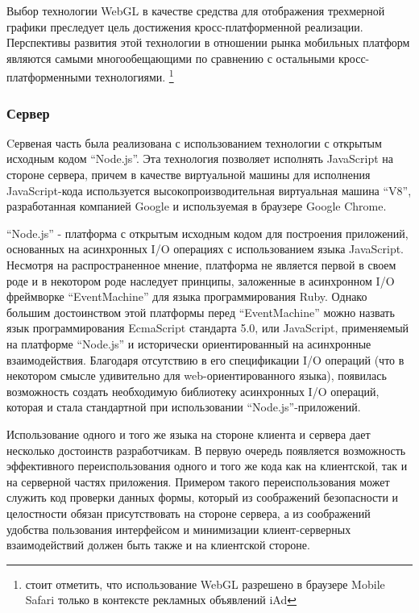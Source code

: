 Выбор технологии WebGL в качестве средства для отображения трехмерной графики
преследует цель достижения кросс-платформенной реализации. Перспективы развития
этой технологии в отношении рынка мобильных платформ являются самыми
многообещающими по сравнению с остальными кросс-платформенными технологиями.
\footnote{стоит отметить, что использование WebGL разрешено в браузере Mobile
Safari только в контексте рекламных объявлений iAd}

\subsubsection{Сервер}

Cервеная часть была реализована с использованием технологии с открытым исходным
кодом ``Node.js''. Эта технология позволяет исполнять JavaScript на стороне
сервера, причем в качестве виртуальной машины для исполнения JavaScript-кода
используется высокопроизводительная виртуальная машина ``V8'', разработанная
компанией Google и используемая в браузере Google Chrome.

``Node.js''\cite{nodejs} - платформа с открытым исходным кодом для построения приложений,
основанных на асинхронных I/O операциях с использованием языка JavaScript.
Несмотря на распространенное мнение, платформа не является первой в своем роде и
в некотором роде наследует принципы, заложенные в асинхронном I/O фреймворке
``EventMachine'' для языка программирования Ruby. Однако большим достоинством
этой платформы перед ``EventMachine'' можно назвать язык программирования
EcmaScript стандарта 5.0, или JavaScript, применяемый на платформе ``Node.js'' и
исторически ориентированный на асинхронные взаимодействия.  Благодаря отсутствию
в его спецификации I/O операций (что в некотором смысле удивительно для
web-ориентированного языка), появилась возможность создать необходимую
библиотеку асинхронных I/O операций, которая и стала стандартной при
использовании ``Node.js''-приложений.

Использование одного и того же языка на стороне клиента и сервера дает несколько
достоинств разработчикам. В первую очередь появляется возможность эффективного
переиспользования одного и того же кода как на клиентской, так и на серверной
частях приложения. Примером такого переиспользования может служить
код проверки данных формы, который из соображений безопасности и целостности
обязан присутствовать на стороне сервера, а из соображений удобства пользования
интерфейсом и минимизации клиент-серверных взаимодействий должен быть также и на
клиентской стороне.

